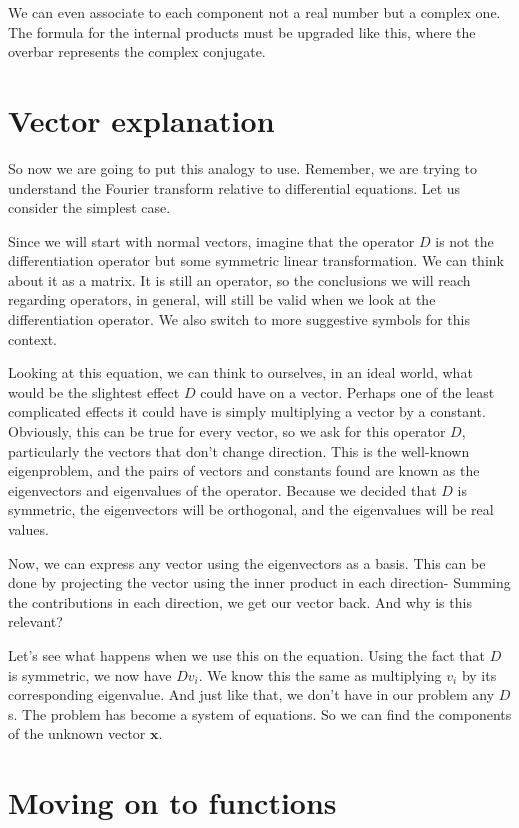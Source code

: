 \documentclass{article}
\newcounter{problem}[section]\setcounter{problem}{1}
\begin{document}
We can even associate to each component not a real number but a complex one.
The formula for the internal products must be upgraded like this, where the overbar represents the complex conjugate.


\section{Vector explanation}

So now we are going to put this analogy to use.
Remember, we are trying to understand the Fourier transform relative to differential equations.
Let us consider the simplest case.

Since we will start with normal vectors, imagine that the operator \(D\) is not the differentiation operator but some symmetric linear transformation.
We can think about it as a matrix.
It is still an operator, so the conclusions we will reach regarding operators, in general, will still be valid when we look at the differentiation operator.
We also switch to more suggestive symbols for this context.

Looking at this equation, we can think to ourselves, in an ideal world, what would be the slightest effect $D$ could have on a vector.
Perhaps one of the least complicated effects it could have is simply multiplying a vector by a constant.
Obviously, this can be true for every vector, so we ask for this operator $D$, particularly the vectors that don't change direction.
This is the well-known eigenproblem, and the pairs of vectors and constants found are known as the eigenvectors and eigenvalues of the operator.
Because we decided that $D$ is symmetric, the eigenvectors will be orthogonal, and the eigenvalues will be real values.

Now, we can express any vector using the eigenvectors as a basis.
This can be done by projecting the vector using the inner product in each direction-
Summing the contributions in each direction, we get our vector back.
And why is this relevant?

Let's see what happens when we use this on the equation.
Using the fact that $D$ is symmetric, we now have $D v_i$. We know this the same as multiplying $v_i$ by its corresponding eigenvalue.
And just like that, we don't have in our problem any $D$s. The problem has become a system of equations.
So we can find the components of the unknown vector $\bm x$.

\section{Moving on to functions}
\end{document}
